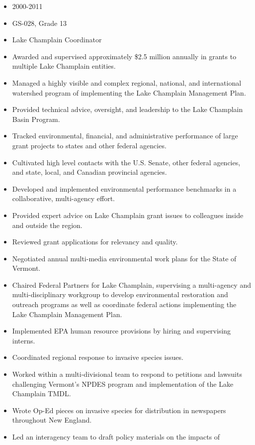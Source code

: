 \documentclass[12pt]{article}
\begin{document}
\begin{itemize}
\item
  2000-2011
\item
  GS-028, Grade 13
\item
  Lake Champlain Coordinator
\item
  Awarded and supervised approximately \$2.5 million annually in grants
  to multiple Lake Champlain entities.
\item
  Managed a highly visible and complex regional, national, and
  international watershed program of implementing the Lake Champlain
  Management Plan.
\item
  Provided technical advice, oversight, and leadership to the Lake
  Champlain Basin Program.
\item
  Tracked environmental, financial, and administrative performance of
  large grant projects to states and other federal agencies.
\item
  Cultivated high level contacts with the U.S. Senate, other federal
  agencies, and state, local, and Canadian provincial agencies.
\item
  Developed and implemented environmental performance benchmarks in a
  collaborative, multi-agency effort.
\item
  Provided expert advice on Lake Champlain grant issues to colleagues
  inside and outside the region.
\item
  Reviewed grant applications for relevancy and quality.
\item
  Negotiated annual multi-media environmental work plans for the State
  of Vermont.
\item
  Chaired Federal Partners for Lake Champlain, supervising a
  multi-agency and multi-disciplinary workgroup to develop environmental
  restoration and outreach programs as well as coordinate federal
  actions implementing the Lake Champlain Management Plan.
\item
  Implemented EPA human resource provisions by hiring and supervising
  interns.
\item
  Coordinated regional response to invasive species issues.
\item
  Worked within a multi-divisional team to respond to petitions and
  lawsuits challenging Vermont's NPDES program and implementation of the
  Lake Champlain TMDL.
\item
  Wrote Op-Ed pieces on invasive species for distribution in newspapers
  throughout New England.
\item
  Led an interagency team to draft policy materials on the impacts of

\end{itemize}
\end{document}
